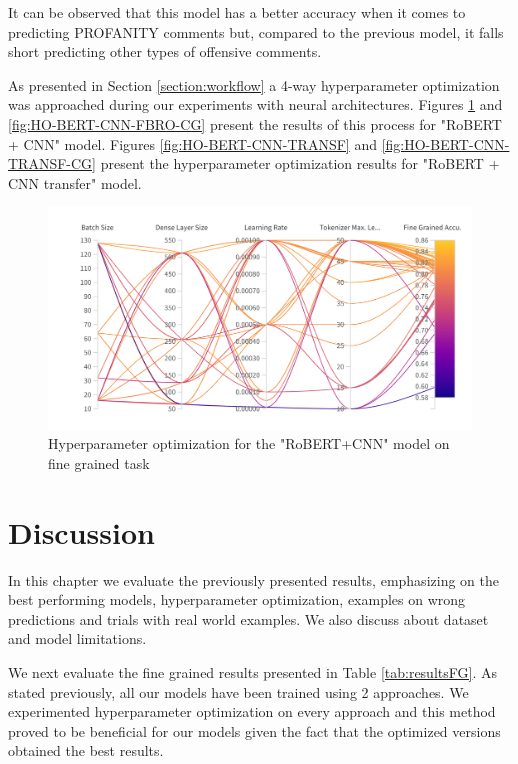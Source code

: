 \documentclass[12pt,a4paper]{report}
\begin{document}
It can be observed that this model has a better accuracy when it comes to predicting PROFANITY comments but, compared to the previous model, it falls short predicting other types of offensive comments.

As presented in Section \ref{section:workflow} a 4-way hyperparameter optimization was approached during our experiments with neural architectures. Figures \ref{fig:HO-BERT-CNN-FBRO} and \ref{fig:HO-BERT-CNN-FBRO-CG} present the results of this process for "RoBERT + CNN" model. Figures \ref{fig:HO-BERT-CNN-TRANSF} and \ref{fig:HO-BERT-CNN-TRANSF-CG} present the hyperparameter optimization results for "RoBERT + CNN transfer" model.

\begin{figure}[H]
\centering
\includegraphics[width=16cm]{pics/fg-wandb-BERT-CNN-FBRO.png}
  \caption{Hyperparameter optimization for the "RoBERT+CNN" model on fine grained task}
  \label{fig:HO-BERT-CNN-FBRO}
\end{figure}


\chapter{Discussion}
\label{chap:Discussions}
In this chapter we evaluate the previously presented results, emphasizing on the best performing models, hyperparameter optimization, examples on wrong predictions and trials with real world examples. We also discuss about dataset and model limitations.

We next evaluate the fine grained results presented in Table \ref{tab:resultsFG}.
As stated previously, all our models have been trained using 2 approaches. We experimented hyperparameter optimization on every approach and this method proved to be beneficial for our models given the fact that the optimized versions obtained the best results.
\end{document}
